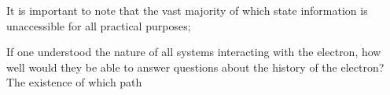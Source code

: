  It is important to note that the vast majority of which state information is unaccessible for all practical purposes;

 If one understood the nature of all systems interacting with the electron, how well would they be able to answer questions about the history of the electron? The existence of which path
%
%
%
%
%
%
%
%
